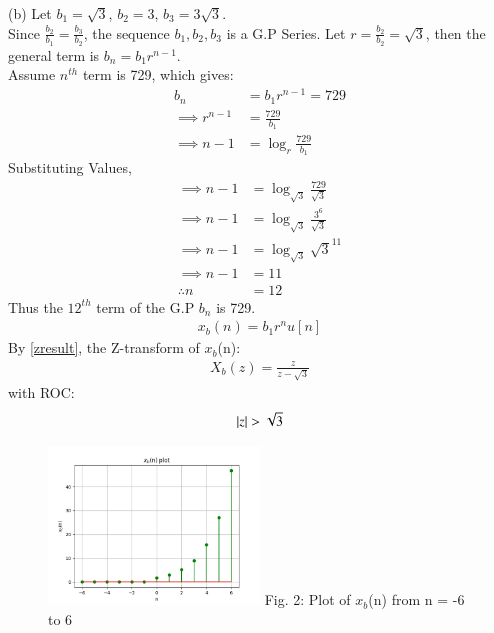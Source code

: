 \documentclass[journal,12pt,twocolumn]{IEEEtran}
\theoremstyle{remark}
\begin{document}
(b) Let $b_1 = \sqrt{3}$, $b_2 = 3$, $b_3 = 3\sqrt{3}$.\\
Since $\frac{b_2}{b_1} = \frac{b_3}{b_2}$, the sequence $b_1, b_2, b_3$ is a G.P Series.
Let $r = \frac{b_2}{b_2} = \sqrt{3}$, then the general term is $b_n = b_1 r^{n-1}$.\\
Assume $n^{th}$ term is 729, which gives: 
\begin{align}
    b_n &= b_1 r^{n-1} = 729\\
    \implies r^{n-1} &= \frac{729}{b_1}\\
    \implies n - 1 &= \log_{r}{\frac{729}{b_1}}
\end{align}
Substituting Values,
\begin{align}
    \implies n - 1 &= \log_{\sqrt{3}}{\frac{729}{\sqrt{3}}}\\
    \implies n - 1 &= \log_{\sqrt{3}}{\frac{3^6}{\sqrt{3}}}\\
    \implies n - 1 &= \log_{\sqrt{3}}{\sqrt{3}^{11}}\\
    \implies n - 1 &= 11\\
    \therefore n &= 12
\end{align}
Thus the $12^{th}$ term of the G.P $b_n$ is 729.
\begin{align}  x_b(n) = b_1r^nu[n]  \end{align}
By \ref{zresult}, the Z-transform of $x_b$(n):
\begin{align} X_b(z) = \frac{z}{z - \sqrt{3}} \end{align}
with ROC: \[ \left\vert z\right\vert > \sqrt{3} \]
\begin{figure}[h!]
    \centering
    \includegraphics[width=0.5\textwidth]{figs/b.png}
    Fig. 2: Plot of $x_b$(n) from n = -6 to 6
    \label{fig:img2}
\end{figure}
\end{document}
